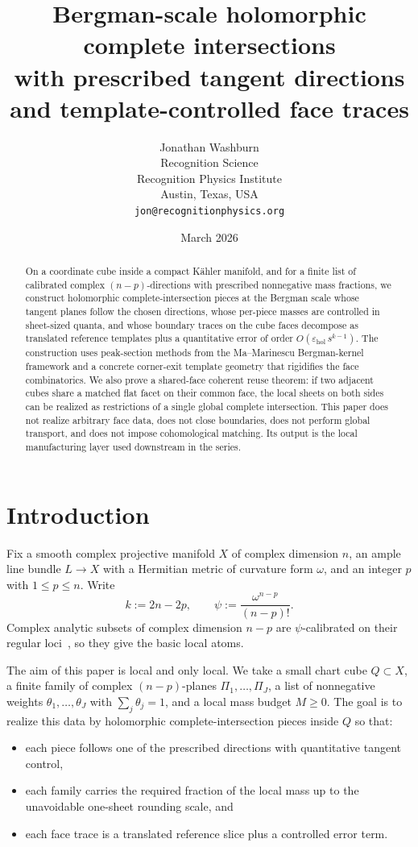 \documentclass[11pt]{article}
\title{Bergman-scale holomorphic complete intersections\\with prescribed tangent directions and template-controlled face traces}
\author{Jonathan Washburn\\
Recognition Science\\
Recognition Physics Institute\\
Austin, Texas, USA\\
\texttt{jon@recognitionphysics.org}}
\date{March 2026}
\numberwithin{equation}{section}
\theoremstyle{plain}
\theoremstyle{definition}
\theoremstyle{remark}
\begin{document}
\maketitle

\begin{abstract}
On a coordinate cube inside a compact K\"ahler manifold, and for a finite list of calibrated complex $(n{-}p)$-directions with prescribed nonnegative mass fractions, we construct holomorphic complete-intersection pieces at the Bergman scale whose tangent planes follow the chosen directions, whose per-piece masses are controlled in sheet-sized quanta, and whose boundary traces on the cube faces decompose as translated reference templates plus a quantitative error of order $O(\varepsilon_{\mathrm{hol}}\,s^{k-1})$.  The construction uses peak-section methods from the Ma--Marinescu Bergman-kernel framework and a concrete corner-exit template geometry that rigidifies the face combinatorics.  We also prove a shared-face coherent reuse theorem: if two adjacent cubes share a matched flat facet on their common face, the local sheets on both sides can be realized as restrictions of a single global complete intersection.  This paper does not realize arbitrary face data, does not close boundaries, does not perform global transport, and does not impose cohomological matching.  Its output is the local manufacturing layer used downstream in the series.
\end{abstract}

\section{Introduction}

Fix a smooth complex projective manifold $X$ of complex dimension $n$, an ample line bundle $L \to X$ with a Hermitian metric of curvature form $\omega$, and an integer $p$ with $1 \le p \le n$.  Write
\[
k := 2n-2p,
\qquad
\psi := \frac{\omega^{n-p}}{(n-p)!}.
\]
Complex analytic subsets of complex dimension $n-p$ are $\psi$-calibrated on their regular loci~\cite{HL82}, so they give the basic local atoms.

The aim of this paper is local and only local.  We take a small chart cube $Q \subset X$, a finite family of complex $(n-p)$-planes $\Pi_1,\dots,\Pi_J$, a list of nonnegative weights $\theta_1,\dots,\theta_J$ with $\sum_j \theta_j = 1$, and a local mass budget $M \ge 0$.  The goal is to realize this data by holomorphic complete-intersection pieces inside $Q$ so that:
\begin{itemize}
\item each piece follows one of the prescribed directions with quantitative tangent control,
\item each family carries the required fraction of the local mass up to the unavoidable one-sheet rounding scale, and
\item each face trace is a translated reference slice plus a controlled error term.
\end{itemize}
\end{document}
